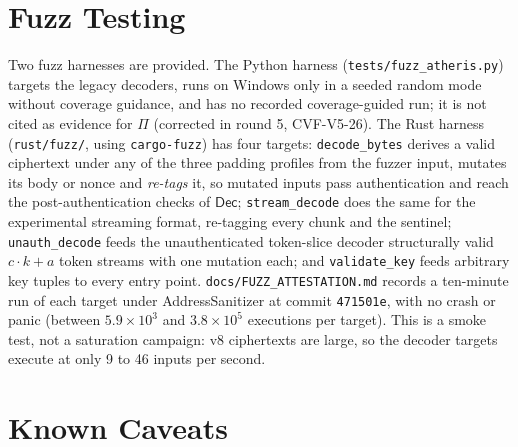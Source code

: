 \documentclass[11pt,a4paper]{article}
\begin{document}
\section{Fuzz Testing}
\label{sec:fuzz}

Two fuzz harnesses are provided. The Python harness
(\texttt{tests/fuzz\_atheris.py}) targets the legacy decoders, runs on
Windows only in a seeded random mode without coverage guidance, and has no
recorded coverage-guided run; it is not cited as evidence for $\Pi$
(corrected in round 5, CVF-V5-26). The Rust harness (\texttt{rust/fuzz/},
using \texttt{cargo-fuzz}) has four targets: \texttt{decode\_bytes} derives
a valid ciphertext under any of the three padding profiles from the fuzzer
input, mutates its body or nonce and \emph{re-tags} it, so mutated inputs
pass authentication and reach the post-authentication checks of
$\mathsf{Dec}$; \texttt{stream\_decode} does the same for the experimental
streaming format, re-tagging every chunk and the sentinel;
\texttt{unauth\_decode} feeds the unauthenticated token-slice decoder
structurally valid $c\cdot k+a$ token streams with one mutation each; and
\texttt{validate\_key} feeds arbitrary key tuples to every entry point.
\texttt{docs/FUZZ\_ATTESTATION.md} records a ten-minute run of each target
under AddressSanitizer at commit \texttt{471501e}, with no crash or panic
(between $5.9\times10^{3}$ and $3.8\times10^{5}$ executions per target). This is a
smoke test, not a saturation campaign: v8 ciphertexts are large, so the
decoder targets execute at only 9 to 46 inputs per second.

\section{Known Caveats}
\label{sec:caveats}
\end{document}
